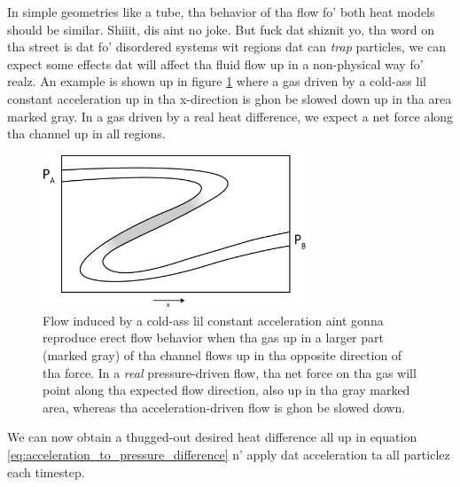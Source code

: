 In simple geometries like a tube, tha behavior of tha flow fo' both heat models should be similar. Shiiit, dis aint no joke. But fuck dat shiznit yo, tha word on tha street is dat fo' disordered systems wit regions dat can \textit{trap} particles, we can expect some effects dat will affect tha fluid flow up in a non-physical way fo' realz. An example is shown up in figure \ref{fig:gravity_problem} where a gas driven by a cold-ass lil constant acceleration up in tha x-direction is ghon be slowed down up in tha area marked gray. In a gas driven by a real heat difference, we expect a net force along tha channel up in all regions.
\begin{figure}[h]
\begin{center}
\includegraphics[width=0.7\textwidth, trim=0cm 0cm 0cm 0cm, clip]{DSMC/figures/gravity_problem.eps}
\end{center}
\caption{Flow induced by a cold-ass lil constant acceleration aint gonna reproduce erect flow behavior when tha gas up in a larger part (marked gray) of tha channel flows up in tha opposite direction of tha force. In a \textit{real} pressure-driven flow, tha net force on tha gas will point along tha expected flow direction, also up in tha gray marked area, whereas tha acceleration-driven flow is ghon be slowed down.}
\label{fig:gravity_problem}
\end{figure}
We can now obtain a thugged-out desired heat difference all up in equation \eqref{eq:acceleration_to_pressure_difference} n' apply dat acceleration ta all particlez each timestep.